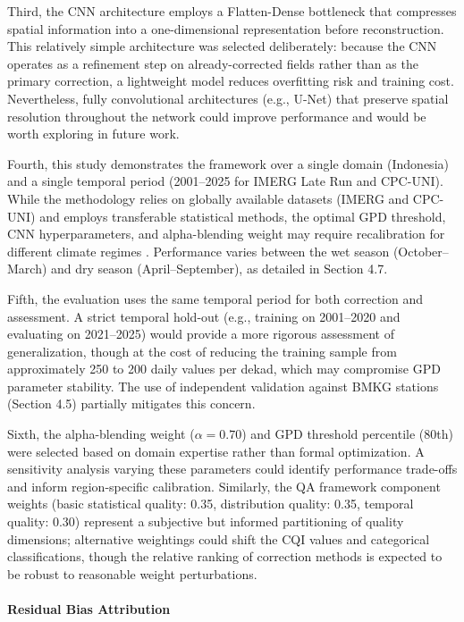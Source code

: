 \documentclass[remotesensing,article,submit,pdftex,moreauthors]{Definitions/mdpi}
\begin{document}
Third, the CNN architecture employs a Flatten-Dense bottleneck that
compresses spatial information into a one-dimensional representation
before reconstruction. This relatively simple architecture was selected
deliberately: because the CNN operates as a refinement step on
already-corrected fields rather than as the primary correction, a
lightweight model reduces overfitting risk and training cost.
Nevertheless, fully convolutional architectures (e.g., U-Net) that
preserve spatial resolution throughout the network could improve
performance and would be worth exploring in future work.

Fourth, this study demonstrates the framework over a single domain
(Indonesia) and a single temporal period (2001--2025 for IMERG Late Run
and CPC-UNI). While the methodology relies on globally available
datasets (IMERG and CPC-UNI) and employs transferable statistical
methods, the optimal GPD threshold, CNN hyperparameters, and
alpha-blending weight may require recalibration for different climate
regimes \cite{ref44,ref45}. Performance varies between the wet season
(October--March) and dry season (April--September), as detailed in
Section 4.7.

Fifth, the evaluation uses the same temporal period for both correction
and assessment. A strict temporal hold-out (e.g., training on 2001--2020
and evaluating on 2021--2025) would provide a more rigorous assessment
of generalization, though at the cost of reducing the training sample
from approximately 250 to 200 daily values per dekad, which may
compromise GPD parameter stability. The use of independent validation
against BMKG stations (Section 4.5) partially mitigates this concern.

Sixth, the alpha-blending weight (\(\alpha = 0.70\)) and GPD threshold
percentile (80th) were selected based on domain expertise rather than
formal optimization. A sensitivity analysis varying these parameters
could identify performance trade-offs and inform region-specific
calibration. Similarly, the QA framework component weights (basic
statistical quality: 0.35, distribution quality: 0.35, temporal quality:
0.30) represent a subjective but informed partitioning of quality
dimensions; alternative weightings could shift the CQI values and
categorical classifications, though the relative ranking of correction
methods is expected to be robust to reasonable weight perturbations.

\paragraph{Residual Bias
Attribution}\label{residual-bias-attribution}
\end{document}
